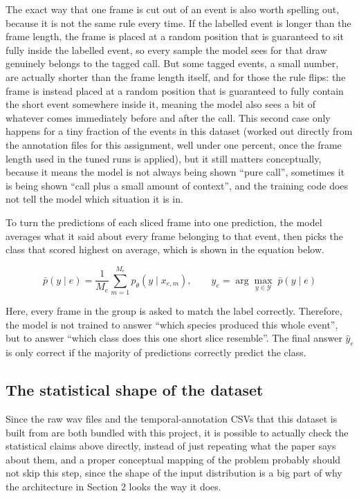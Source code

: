 \documentclass[11pt]{article}
\begin{document}
The exact way that one frame is cut out of an event is also worth spelling out, because it is not the same rule every time. If the labelled event is longer than the frame length, the frame is placed at a random position that is guaranteed to sit fully inside the labelled event, so every sample the model sees for that draw genuinely belongs to the tagged call. But some tagged events, a small number, are actually shorter than the frame length itself, and for those the rule flips: the frame is instead placed at a random position that is guaranteed to fully contain the short event somewhere inside it, meaning the model also sees a bit of whatever comes immediately before and after the call. This second case only happens for a tiny fraction of the events in this dataset (worked out directly from the annotation files for this assignment, well under one percent, once the frame length used in the tuned runs is applied), but it still matters conceptually, because it means the model is not always being shown ``pure call'', sometimes it is being shown ``call plus a small amount of context'', and the training code does not tell the model which situation it is in.

To turn the predictions of each sliced frame into one prediction, the model averages what it said about every frame belonging to that event, then picks the class that scored highest on average, which is shown in the equation below.

\begin{equation}
\bar{p}(y \mid e) = \frac{1}{M_e}\sum_{m=1}^{M_e} p_\theta(y \mid x_{e,m}), \qquad \hat{y}_e = \arg\max_{y \in \mathcal{Y}} \; \bar{p}(y \mid e)
\end{equation}

Here, every frame in the group is asked to match the label correctly. Therefore, the model is not trained to answer ``which species produced this whole event'', but to answer ``which class does this one short slice resemble''. The final answer $\hat{y}_e$ is only correct if the majority of predictions correctly predict the class.

\subsection{The statistical shape of the dataset}
\label{sec:stats}

Since the raw wav files and the temporal-annotation CSVs that this dataset is built from are both bundled with this project, it is possible to actually check the statistical claims above directly, instead of just repeating what the paper says about them, and a proper conceptual mapping of the problem probably should not skip this step, since the shape of the input distribution is a big part of why the architecture in Section 2 looks the way it does.
\end{document}
